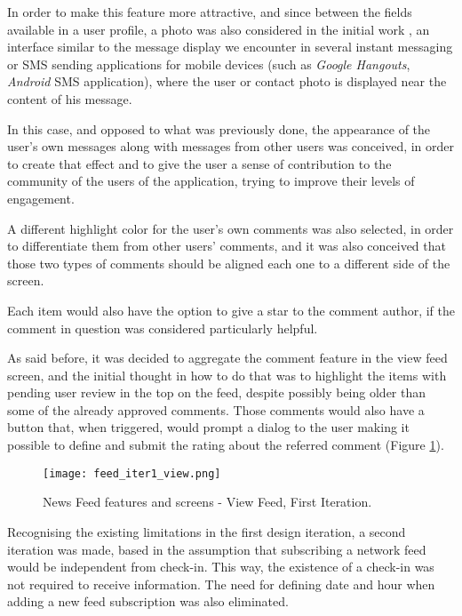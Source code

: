 In order to make this feature more attractive, and since between the fields available in a user profile, a photo was also considered in the initial work \cite{kn:eSG12}, an interface similar to the message display we encounter in several instant messaging or SMS sending applications for mobile devices (such as \emph{Google Hangouts}, \emph{Android} SMS application), where the user or contact photo is displayed near the content of his message.

In this case, and opposed to what was previously done, the appearance of the user's own messages along with messages from other users was conceived, in order to create that effect and to give the user a sense of contribution to the community of the users of the application, trying to improve their levels of engagement.

A different highlight color for the user's own comments was also selected, in order to differentiate them from other users' comments, and it was also conceived that those two types of comments should be aligned each one to a different side of the screen.

Each item would also have the option to give a star to the comment author, if the comment in question was considered particularly helpful. 


As said before, it was decided to aggregate the comment feature in the view feed screen, and the initial thought in how to do that was to highlight the items with pending user review in the top on the feed, despite possibly being older than some of the already approved comments. Those comments would also have a button that, when triggered, would prompt a dialog to the user making it possible to define and submit the rating about the referred comment (Figure \ref{fig:feed_iter1_view}).

\begin{figure}[htb]
  \begin{center}
    \leavevmode
    \texttt{[image: feed\_iter1\_view.png]}
    \caption{News Feed features and screens - View Feed, First Iteration.}
    \label{fig:feed_iter1_view}
  \end{center}
\end{figure}

Recognising the existing limitations in the first design iteration,  a second iteration was made, based in the assumption that subscribing a network feed would be independent from check-in. This way, the existence of a check-in was not required to receive information. The need for defining date and hour when adding a new feed subscription was also eliminated.


